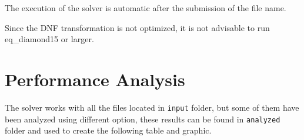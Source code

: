 \documentclass[11pt,a4paper]{article}
\begin{document}
    The execution of the solver is automatic after the submission of the file name.

    Since the DNF transformation is not optimized, it is not advisable to run eq\_diamond15 or larger.

    \section{Performance Analysis}

    The solver works with all the files located in \texttt{input} folder, but some of them have 
    been analyzed using different option, these results can be found in \texttt{analyzed} folder
    and used to create the following table and graphic.

    \newcommand{\selected}{X}
\end{document}
